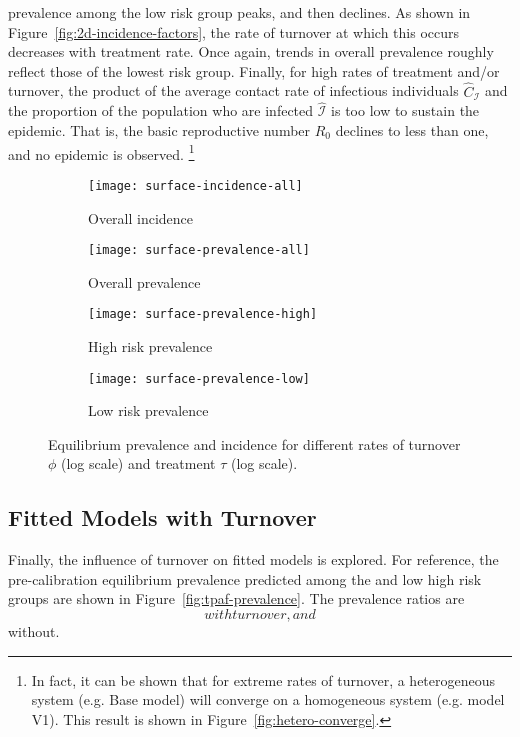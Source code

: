 prevalence among the low risk group peaks, and then declines.
As shown in Figure~\ref{fig:2d-incidence-factors},
the rate of turnover at which this occurs decreases with treatment rate.
Once again, trends in overall prevalence
roughly reflect those of the lowest risk group.
Finally, for high rates of treatment and/or turnover, the product of
the average contact rate of infectious individuals $\hat{C}_\mathcal{I}$
and the proportion of the population who are infected $\hat{\mathcal{I}}$
is too low to sustain the epidemic.
That is, the basic reproductive number $R_0$ declines to less than one,
and no epidemic is observed.%
\footnote{In fact, it can be shown that for extreme rates of turnover,
  a heterogeneous system (e.g. Base model) will converge on
  a homogeneous system (e.g. model V1).
  This result is shown in Figure~\ref{fig:hetero-converge}.}
\begin{figure}
  \centering
  \begin{subfigure}{0.45\linewidth}
    \centering
    \texttt{[image: surface-incidence-all]}
    \caption{Overall incidence}
    \label{fig:surface-incidence-all}
  \end{subfigure}
  \begin{subfigure}{0.45\linewidth}
    \centering
    \texttt{[image: surface-prevalence-all]}
    \caption{Overall prevalence}
    \label{fig:surface-prevalence-all}
  \end{subfigure}
  \begin{subfigure}{0.45\linewidth}
    \centering
    \texttt{[image: surface-prevalence-high]}
    \caption{High risk prevalence}
    \label{fig:surface-prevalence-high}
  \end{subfigure}
  \begin{subfigure}{0.45\linewidth}
    \centering
    \texttt{[image: surface-prevalence-low]}
    \caption{Low risk prevalence}
    \label{fig:surface-prevalence-low}
  \end{subfigure}
  \caption{Equilibrium prevalence and incidence for different rates of
    turnover $\phi$ (log scale) and
    treatment $\tau$ (log scale).}
  \label{fig:surface}
\end{figure}
\subsection{Fitted Models with Turnover}\label{ss:res-turnover-fit}
Finally, the influence of turnover on fitted models is explored.
For reference, the pre-calibration equilibrium prevalence predicted
among the and low high risk groups are shown in Figure~\ref{fig:tpaf-prevalence}.
The prevalence ratios are
$$ with turnover, and 
$$ without.
